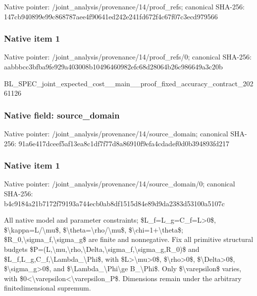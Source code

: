 \documentclass[10pt,a4paper]{article}
\begin{document}
Native pointer: /joint\_analysis/provenan\allowbreak{}ce/14/proof\_refs; canonical SHA-256: 147cb940899e99c868787aee\allowbreak{}4f90641ed242e241fd672f4c\allowbreak{}67f07c3ecd979566



\subsubsection{Native item 1}


Native pointer: /joint\_analysis/provenan\allowbreak{}ce/14/proof\_refs/0; canonical SHA-256: aabbbcc3bfba9fe929a40300\allowbreak{}8b10496460982efc68d28064\allowbreak{}b26c986649a3c20b


BL\_SPEC\_joint\_expected\_c\allowbreak{}ost\_\_main\_\_proof\_fixed\_a\allowbreak{}ccuracy\_contract\_2026112\allowbreak{}6


\subsubsection{Native field: source\_domain}


Native pointer: /joint\_analysis/provenan\allowbreak{}ce/14/source\_domain; canonical SHA-256: 91a6e417dceef5af13ea8c1d\allowbreak{}f7f77d8a86910f9efa4cdade\allowbreak{}f0d0b394893fd217



\subsubsection{Native item 1}


Native pointer: /joint\_analysis/provenan\allowbreak{}ce/14/source\_domain/0; canonical SHA-256: b4c9184a21b7172f79193a74\allowbreak{}4ecb0ab8df1515d84e89d9da\allowbreak{}2383d53100a5107c


All native model and parameter constraints; \$L\_f=L\_g=C\_f=L>0\$, \$\textbackslash{}kappa=L/\textbackslash{}mu\$, \$\textbackslash{}theta=\textbackslash{}rho/\textbackslash{}mu\$, \$\textbackslash{}chi=1+\textbackslash{}theta\$; \$R\_0,\textbackslash{}sigma\_f,\textbackslash{}sigma\_g\$ are finite and nonnegative. Fix all primitive structural budgets \$P=(L,\textbackslash{}mu,\textbackslash{}rho,\textbackslash{}Delta,\textbackslash{}s\allowbreak{}igma\_f,\textbackslash{}sigma\_g,R\_0)\$ and \$L\_f,L\_g,C\_f,\textbackslash{}Lambda\_\textbackslash{}Phi\$, with \$L>\textbackslash{}mu>0\$, \$\textbackslash{}rho>0\$, \$\textbackslash{}Delta>0\$, \$\textbackslash{}sigma\_g>0\$, and \$\textbackslash{}Lambda\_\textbackslash{}Phi\textbackslash{}ge B\_\textbackslash{}Phi\$. Only \$\textbackslash{}varepsilon\$ varies, with \$0<\textbackslash{}varepsilon<\textbackslash{}varepsilon\_P\$. Dimensions remain under the arbitrary finitedimensional supremum.
\end{document}
